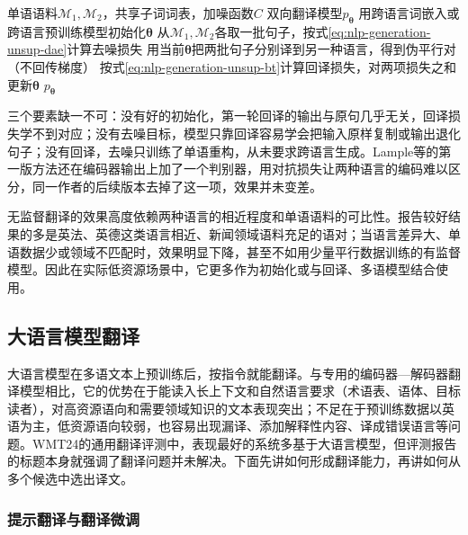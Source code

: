 \begin{algorithm}[无监督机器翻译的训练循环]
  \label{alg:nlp-generation-unsupervised-mt}
  \begin{algorithmic}[1]
    \Require 单语语料$\mathcal M_1,\mathcal M_2$，共享子词词表，加噪函数$C$
    \Ensure 双向翻译模型$p_{\bm\theta}$
    \State 用跨语言词嵌入或跨语言预训练模型初始化$\bm\theta$
    \Repeat
      \State 从$\mathcal M_1,\mathcal M_2$各取一批句子，按式\eqref{eq:nlp-generation-unsup-dae}计算去噪损失
      \State 用当前$\bm\theta$把两批句子分别译到另一种语言，得到伪平行对（不回传梯度）
      \State 按式\eqref{eq:nlp-generation-unsup-bt}计算回译损失，对两项损失之和更新$\bm\theta$
    \State \Return $p_{\bm\theta}$
  \end{algorithmic}
\end{algorithm}

三个要素缺一不可：没有好的初始化，第一轮回译的输出与原句几乎无关，回译损失学不到对应；没有去噪目标，模型只靠回译容易学会把输入原样复制或输出退化句子；没有回译，去噪只训练了单语重构，从未要求跨语言生成。Lample等的第一版方法还在编码器输出上加了一个判别器，用对抗损失让两种语言的编码难以区分，同一作者的后续版本去掉了这一项，效果并未变差。

无监督翻译的效果高度依赖两种语言的相近程度和单语语料的可比性。报告较好结果的多是英法、英德这类语言相近、新闻领域语料充足的语对；当语言差异大、单语数据少或领域不匹配时，效果明显下降，甚至不如用少量平行数据训练的有监督模型。因此在实际低资源场景中，它更多作为初始化或与回译、多语模型结合使用。

\subsection{大语言模型翻译}
\label{sec:nlp-generation-llm-translation}

大语言模型在多语文本上预训练后，按指令就能翻译。与专用的编码器—解码器翻译模型相比，它的优势在于能读入长上下文和自然语言要求（术语表、语体、目标读者），对高资源语向和需要领域知识的文本表现突出；不足在于预训练数据以英语为主，低资源语向较弱，也容易出现漏译、添加解释性内容、译成错误语言等问题。WMT24的通用翻译评测中，表现最好的系统多基于大语言模型，但评测报告的标题本身就强调了翻译问题并未解决。下面先讲如何形成翻译能力，再讲如何从多个候选中选出译文。

\subsubsection{提示翻译与翻译微调}
\label{sec:nlp-generation-llm-mt-prompt-ft}

